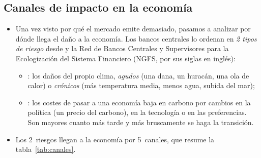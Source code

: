 \documentclass[11pt]{article}
\begin{document}
\subsection{Canales de impacto en la economía}\label{sec:canales}

\begin{itemize}
\item Una vez visto por qué el mercado emite demasiado, pasamos a analizar por dónde llega el daño a la economía. Los bancos centrales lo ordenan en \emph{2 tipos de riesgo} desde \textcite{Carney2015Breaking} y la Red de Bancos Centrales y Supervisores para la Ecologización del Sistema Financiero (NGFS, por sus siglas en inglés)\nocite{NGFS2019Call}:
  \begin{itemize}
  \item {}: los daños del propio clima, \emph{agudos} (una dana, un huracán, una ola de calor) o \emph{crónicos} (más temperatura media, menos agua, subida del mar);
  \item {}: los costes de pasar a una economía baja en carbono por cambios en la política (un precio del carbono), en la tecnología o en las preferencias. Son mayores cuanto más tarde y más bruscamente se haga la transición.
  \end{itemize}
\item Los 2~riesgos llegan a la economía por 5~canales, que resume la tabla~\ref{tab:canales}.
\end{itemize}
\end{document}

